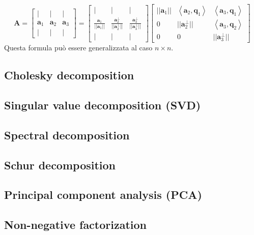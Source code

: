 \documentclass[10pt]{article}
\begin{document}
\begin{equation}
\mathbf{A} = 
\begin{bmatrix}
| & | & | \\
\mathbf{a}_1 & \mathbf{a}_2 & \mathbf{a}_3 \\
| & | & |
\end{bmatrix} = 
\begin{bmatrix}
| & | & | \\
\frac{\mathbf{a}_1}{||\mathbf{a}_1||} & \frac{\mathbf{a}_2^\perp}{||\mathbf{a}_2^\perp||} & \frac{\mathbf{a}_3^\perp}{||\mathbf{a}_3^\perp||} \\
| & | & |
\end{bmatrix}
\begin{bmatrix}
||\mathbf{a}_1|| & \left<\mathbf{a}_2,\mathbf{q}_1\right> & \left<\mathbf{a}_3,\mathbf{q}_1\right> \\
0 & ||\mathbf{a}_2^\perp|| & \left<\mathbf{a}_3,\mathbf{q}_2\right> \\
0 & 0 & ||\mathbf{a}_3^\perp||
\end{bmatrix}
\end{equation}
Questa formula può essere generalizzata al caso $n\times n$.


\subsection{Cholesky decomposition}

\subsection{Singular value decomposition (SVD)}

\subsection{Spectral decomposition}

\subsection{Schur decomposition}

\subsection{Principal component analysis (PCA)}

\subsection{Non-negative factorization}
\end{document}
